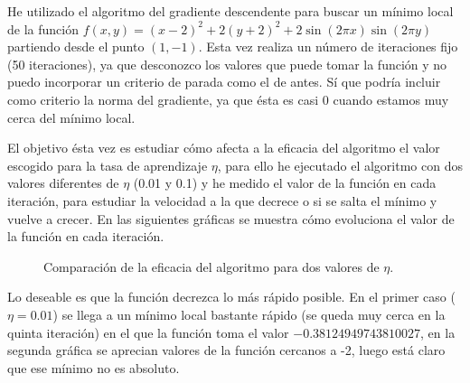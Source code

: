 \documentclass[a4]{article}
\begin{document}
He utilizado el algoritmo del gradiente descendente para buscar un mínimo local de la función
$f(x,y)=(x-2)^2+2(y+2)^2+2\sin(2\pi x)\sin(2\pi y)$ partiendo desde el punto $(1,-1)$. Esta vez
realiza un número de iteraciones fijo (50 iteraciones), ya que desconozco los valores que puede
tomar la función y no puedo incorporar un criterio de parada como el de antes. Sí que podría incluir
como criterio la norma del gradiente, ya que ésta es casi 0 cuando estamos muy cerca del mínimo local.

El objetivo ésta vez es estudiar cómo afecta a la eficacia del algoritmo el valor escogido para la
tasa de aprendizaje $\eta$, para ello he ejecutado el algoritmo con dos valores diferentes de $\eta$
(0.01 y 0.1) y he medido el valor de la función en cada iteración, para estudiar la velocidad a la que
decrece o si se salta el mínimo y vuelve a crecer. En las siguientes gráficas se muestra cómo evoluciona
el valor de la función en cada iteración.

\begin{figure}[H]
    \centering    
    \caption{Comparación de la eficacia del algoritmo para dos valores de $\eta$.}
    \label{fig:comp-eta}
\end{figure}

Lo deseable es que la función decrezca lo más rápido posible. En el primer caso ($\eta=0.01$) se llega a un mínimo local
bastante rápido (se queda muy cerca en la quinta iteración) en el que la función toma el valor $-0.38124949743810027$,
en la segunda gráfica se aprecian valores de la función cercanos a -2, luego está claro que ese mínimo no es absoluto.
\end{document}

